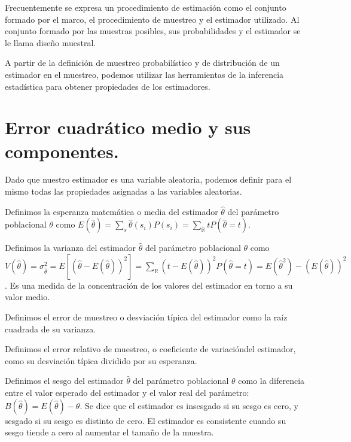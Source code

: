 Frecuentemente se expresa un procedimiento de estimaci\'on como el conjunto
formado por el marco, el procedimiento de muestreo y el estimador
utilizado. Al conjunto formado por las muestras posibles, sus probabilidades
y el estimador se le llama dise\~no muestral.

A partir de la definici\'on de muestreo probabil\'istico y de distribuci\'on
de un estimador en el muestreo, podemos utilizar las herramientas
de la inferencia estad\'istica para obtener propiedades de los estimadores.


\section{Error cuadr\'atico medio y sus componentes.}

Dado que nuestro estimador es una variable aleatoria, podemos definir
para el mismo todas las propiedades asignadas a las variables aleatorias.

Definimos la esperanza matem\'atica o media del estimador $\hat{\theta}$
del par\'ametro poblacional $\theta$ como $E\left(\hat{\theta}\right)=\sum_{s}\hat{\theta}\left(s_{i}\right)P\left(s_{i}\right)=\sum_{\mathbb{R}}tP\left(\hat{\theta}=t\right)$.

Definimos la varianza del estimador $\hat{\theta}$ del par\'ametro
poblacional $\theta$ como $V\left(\hat{\theta}\right)=\sigma_{\hat{\theta}}^{2}=E\left[\left(\hat{\theta}-E\left(\hat{\theta}\right)\right)^{2}\right]=\sum_{\mathbb{R}}\left(t-E\left(\hat{\theta}\right)\right)^{2}P\left(\hat{\theta}=t\right)=E\left(\hat{\theta}^{2}\right)-\left(E\left(\hat{\theta}\right)\right)^{2}$.
Es una medida de la concentraci\'on de los valores del estimador en
torno a su valor medio.

Definimos el error de muestreo o desviaci\'on t\'ipica del estimador como
la ra\'iz cuadrada de su varianza.

Definimos el error relativo de muestreo, o coeficiente de variaci\'ondel
estimador, como su desviaci\'on t\'ipica dividido por su esperanza.

Definimos el sesgo del estimador $\hat{\theta}$ del par\'ametro poblacional
$\theta$ como la diferencia entre el valor esperado del estimador
y el valor real del par\'ametro: $B\left(\hat{\theta}\right)=E\left(\hat{\theta}\right)-\theta$.
Se dice que el estimador es insesgado si su sesgo es cero, y sesgado
si su sesgo es distinto de cero. El estimador es consistente cuando
su sesgo tiende a cero al aumentar el tama\~no de la muestra.


